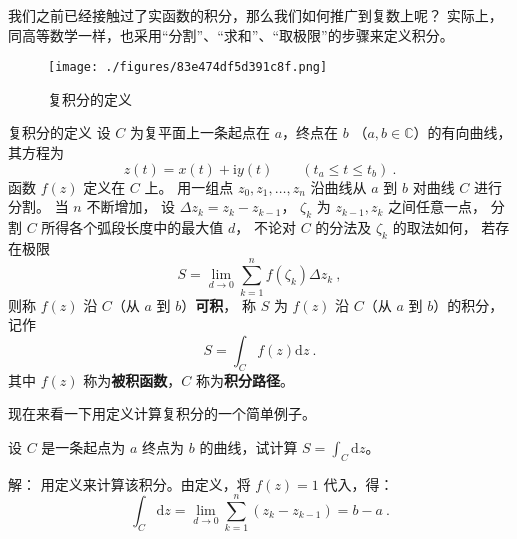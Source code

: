 
\begin{issues}
\end{issues}



我们之前已经接触过了实函数的积分，那么我们如何推广到复数上呢？ 实际上，同高等数学一样，也采用“分割”、“求和”、“取极限”的步骤来定义积分。

\begin{figure}[ht]
\centering
\texttt{[image: ./figures/83e474df5d391c8f.png]}
\caption{复积分的定义} \label{fig_CpxInt_1}
\end{figure}

\begin{definition}{复积分的定义}
设 $C$ 为复平面上一条起点在 $a$，终点在 $b$ （$a,b\in\mathbb C$）的有向曲线， 其方程为
\begin{equation}
z(t)=x(t)+\mathrm{i} y(t) \qquad(t_a \leqslant t \leqslant t_b)~.
\end{equation}
函数 $f(z)$ 定义在 $C$ 上。 用一组点 $z_{0}, z_{1}, \dots, z_{n}$ 沿曲线从 $a$ 到 $b$ 对曲线 $C$ 进行分割。 当 $n$ 不断增加， 设 $\Delta z_{k}=z_{k}-z_{k-1}$， $\zeta_k$ 为 $z_{k-1},z_k$ 之间任意一点， 分割 $C$ 所得各个弧段长度中的最大值 $d$， 不论对 $C$ 的分法及 $\zeta_k$ 的取法如何， 若存在极限
\begin{equation}
S = \lim_{d \rightarrow 0} \sum_{k=1}^{n} f\left(\zeta_{k}\right) \Delta z_{k}~,
\end{equation}
则称 $f(z)$ 沿 $C $（从 $a$ 到 $b$）\textbf{可积}， 称 $S$ 为 $f(z)$ 沿 $C$（从 $a$ 到 $b$）的积分，记作
\begin{equation}
S=\int_{C} f(z) \mathrm{d} z~.
\end{equation}
其中 $f (z)$ 称为\textbf{被积函数}，$C$ 称为\textbf{积分路径}。
\end{definition}

现在来看一下用定义计算复积分的一个简单例子。
\begin{example}{}
设 $C$ 是一条起点为 $a$ 终点为 $b$ 的曲线，试计算 $\displaystyle S=\int_C\mathrm dz$。

解： 用定义来计算该积分。由定义，将 $f(z)=1$ 代入，得：
\begin{equation}
\int_{C} \mathrm{d} z=\lim _{d \rightarrow 0} \sum_{k=1}^{n}\left(z_{k}-z_{k-1}\right)= b-a~.
\end{equation}
\end{example}

